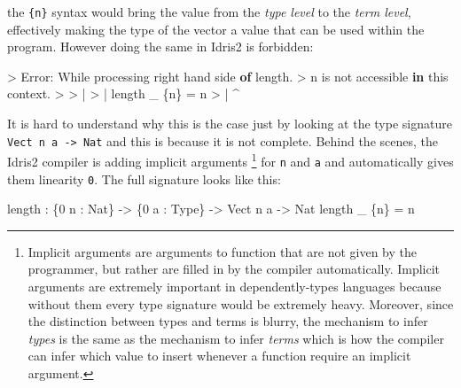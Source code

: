 \documentclass[
]{article}
\newenvironment{Shaded}{}{}
\newcommand{\DataTypeTok}[1]{\textcolor[rgb]{0.56,0.13,0.00}{#1}}
\newcommand{\DecValTok}[1]{\textcolor[rgb]{0.25,0.63,0.44}{#1}}
\newcommand{\FunctionTok}[1]{\textcolor[rgb]{0.02,0.16,0.49}{#1}}
\newcommand{\KeywordTok}[1]{\textcolor[rgb]{0.00,0.44,0.13}{\textbf{#1}}}
\newcommand{\NormalTok}[1]{#1}
\newcommand{\OperatorTok}[1]{\textcolor[rgb]{0.40,0.40,0.40}{#1}}
\newcommand{\OtherTok}[1]{\textcolor[rgb]{0.00,0.44,0.13}{#1}}
\begin{document}
the \texttt{\{n\}} syntax would bring the value from the \emph{type
level} to the \emph{term level}, effectively making the type of the
vector a value that can be used within the program. However doing the
same in Idris2 is forbidden:

\begin{Shaded}
\begin{Highlighting}[]
\OperatorTok{\textgreater{}} \DataTypeTok{Error}\OperatorTok{:} \DataTypeTok{While}\NormalTok{ processing right hand side }\KeywordTok{of} \FunctionTok{length}\OperatorTok{.} 
\OperatorTok{\textgreater{}}\NormalTok{   n is }\FunctionTok{not}\NormalTok{ accessible }\KeywordTok{in}\NormalTok{ this context}\OperatorTok{.}
\OperatorTok{\textgreater{}} 
\OperatorTok{\textgreater{}}     \OperatorTok{|}
\OperatorTok{\textgreater{}}     \OperatorTok{|} \FunctionTok{length}\NormalTok{ \_ \{n\} }\OtherTok{=}\NormalTok{ n}
\OperatorTok{\textgreater{}}     \OperatorTok{|}                \OperatorTok{\^{}}
\end{Highlighting}
\end{Shaded}

It is hard to understand why this is the case just by looking at the
type signature \texttt{Vect\ n\ a\ -\textgreater{}\ Nat} and this is
because it is not complete. Behind the scenes, the Idris2 compiler is
adding implicit arguments \footnote{Implicit arguments are arguments to
  function that are not given by the programmer, but rather are filled
  in by the compiler automatically. Implicit arguments are extremely
  important in dependently-types languages because without them every
  type signature would be extremely heavy. Moreover, since the
  distinction between types and terms is blurry, the mechanism to infer
  \emph{types} is the same as the mechanism to infer \emph{terms} which
  is how the compiler can infer which value to insert whenever a
  function require an implicit argument.} for \texttt{n} and \texttt{a}
and automatically gives them linearity \texttt{0}. The full signature
looks like this:

\begin{Shaded}
\begin{Highlighting}[]
\FunctionTok{length} \OperatorTok{:}\NormalTok{ \{}\DecValTok{0}\NormalTok{ n }\OperatorTok{:} \DataTypeTok{Nat}\NormalTok{\} }\OtherTok{{-}\textgreater{}}\NormalTok{ \{}\DecValTok{0}\NormalTok{ a }\OperatorTok{:} \DataTypeTok{Type}\NormalTok{\} }\OtherTok{{-}\textgreater{}} \DataTypeTok{Vect}\NormalTok{ n a }\OtherTok{{-}\textgreater{}} \DataTypeTok{Nat}
\FunctionTok{length}\NormalTok{ \_ \{n\} }\OtherTok{=}\NormalTok{ n}
\end{Highlighting}
\end{Shaded}
\end{document}
